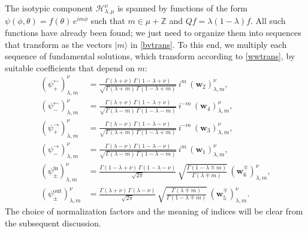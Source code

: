 \documentclass[12pt]{article}
\newcommand{\lt}{\left}
\newcommand{\rt}{\right}
\newcommand*{\ket}[1]{|{#1}\rangle}
\newcommand{\calH}{\mathcal{H}}
\newcommand{\ZZ}{\mathbb{Z}}
\newcommand{\lar}{{\leftarrow}}
\newcommand{\rar}{{\rightarrow}}
\newcommand{\IN}{\text{in}}
\newcommand{\OUT}{\text{out}}
\newcommand{\ww}{\mathbf{w}}
\newcommand{\lam}{\lambda}
\begin{document}
The isotypic component $\calH^{\nu}_{\lambda,\mu}$ is spanned by functions of the form $\psi(\phi,\theta)=f(\theta)\,e^{im\phi}$ such that $m\in\mu+\ZZ$ and $Qf=\lambda(1-\lambda)f$. All such functions have already been found; we just need to organize them into sequences that transform as the vectors $\ket{m}$ in \eqref{bvtrans}. To this end, we multiply each sequence of fundamental solutions, which transform according to \eqref{wwtrans}, by suitable coefficients that depend on $m$:
\begin{equation}\label{normfs}
\begin{aligned}
\lt( \psi^{\lar}_{+} \rt)^{\nu}_{\lambda,m}&=
\frac{\Gamma(\lambda+\nu)\,\Gamma(1-\lambda+\nu)}
{\sqrt{\Gamma(\lambda+m)\,\Gamma(1-\lambda+m)}}\,i^{m}\,\lt(\ww_{2}\rt)_{\lam,m}^{\nu},
\\[3pt]
\lt( \psi^{\lar}_{-} \rt)^{\nu}_{\lambda,m}&=
\frac{\Gamma(\lambda+\nu)\,\Gamma(1-\lambda+\nu)}
{\sqrt{\Gamma(\lambda-m)\,\Gamma(1-\lambda-m)}}\,i^{-m}\,\lt(\ww_{4}\rt)_{\lam,m}^{\nu},
\\[3pt]
\lt( \psi^{\rar}_{+} \rt)^{\nu}_{\lambda,m}&=
\frac{\Gamma(\lambda-\nu)\,\Gamma(1-\lambda-\nu)}
{\sqrt{\Gamma(\lambda+m)\,\Gamma(1-\lambda+m)}}\,i^{-m}\,\lt(\ww_{3}\rt)_{\lam,m}^{\nu},
\\[3pt]
\lt( \psi^{\rar}_{-} \rt)^{\nu}_{\lambda,m}&=
\frac{\Gamma(\lambda-\nu)\,\Gamma(1-\lambda-\nu)}
{\sqrt{\Gamma(\lambda-m)\,\Gamma(1-\lambda-m)}}\,i^{m}\,\lt(\ww_{1}\rt)_{\lam,m}^{\nu},
\\[3pt]
\lt( \psi^{\IN}_{\pm} \rt)^{\nu}_{\lambda,m}&=
\frac{\Gamma(1-\lambda+\nu)\,\Gamma(1-\lambda-\nu)}{\sqrt{2\pi}}\,
\sqrt{\frac{\Gamma(1-\lambda\mp m)}{\Gamma(\lambda\mp m)}}\,\lt(\ww^{\mp}_{6}\rt)_{\lam, m}^{\nu},
\\[3pt]
\lt( \psi^{\OUT}_{\pm} \rt)^{\nu}_{\lambda,m}&=
\frac{\Gamma(\lambda+\nu)\,\Gamma(\lambda-\nu)}{\sqrt{2\pi}}\,
\sqrt{\frac{\Gamma(\lambda\mp m)}{\Gamma(1-\lambda\mp m)}}\,\lt(\ww^{\mp}_{5}\rt)_{\lam,m}^{\nu}.
\end{aligned}
\end{equation}
The choice of normalization factors and the meaning of indices will be clear from the subsequent discussion.
\end{document}
